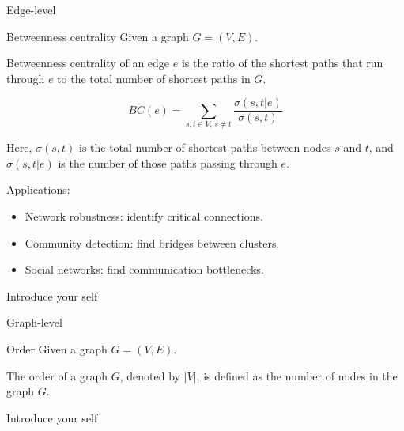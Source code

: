     \begin{frame}{Edge-level}
        \begin{exampleblock}{Betweenness centrality}
            Given a graph $G = (V, E)$.
            
            Betweenness centrality of an edge $e$ is the ratio of the shortest paths that run through $e$ to the total number of shortest paths in $G$.
        \end{exampleblock}

        \begin{equation}
            BC(e) = {\sum_{s, t \in V ,\, s \neq t} \frac{\sigma(s, t | e)}{\sigma(s, t)}}
        \end{equation}

        Here, $\sigma(s, t)$ is the total number of shortest paths between nodes $s$ and $t$, and $\sigma(s, t | e)$ is the number of those paths passing through $e$. \newline
        
        Applications:
        \begin{itemize}
            \item Network robustness: identify critical connections.
            \item Community detection: find bridges between clusters.
            \item Social networks: find communication bottlenecks.
        \end{itemize}

        \begin{note}
            {Introduce your self}
        \end{note}
    \end{frame}

    \begin{frame}{Graph-level}
        \begin{exampleblock}{Order}
            Given a graph $G = (V, E)$.
            
            The order of a graph $G$, denoted by $|V|$, is defined as the number of nodes in the graph $G$.
        \end{exampleblock}

        \begin{note}
            {Introduce your self}
        \end{note}
    \end{frame}

